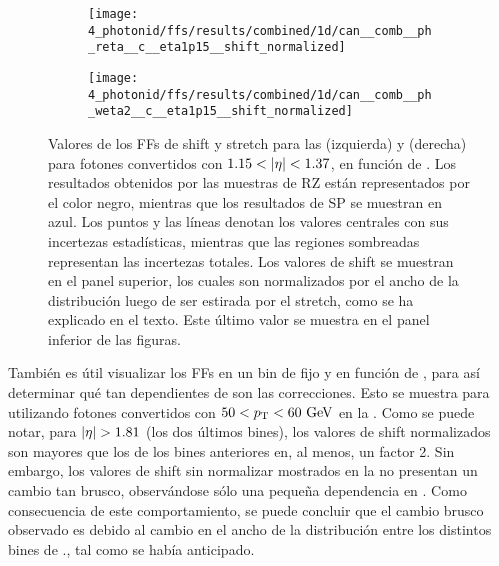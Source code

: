 \begin{figure}[ht!]
    \centering
    \begin{subfigure}[h]{0.49\linewidth}
        \centering
        \texttt{[image: 4\_photonid/ffs/results/combined/1d/can\_\_comb\_\_ph\_reta\_\_c\_\_eta1p15\_\_shift\_normalized]}
        \caption{\reta}
        \label{fig:ss_corrections:ffs:reslts:ffs:reta}
    \end{subfigure}
    \hfill
    \begin{subfigure}[h]{0.49\linewidth}
        \centering
        \texttt{[image: 4\_photonid/ffs/results/combined/1d/can\_\_comb\_\_ph\_weta2\_\_c\_\_eta1p15\_\_shift\_normalized]}
        \caption{\weta}
        \label{fig:ss_corrections:ffs:reslts:ffs:weta}
    \end{subfigure}
    \caption{Valores de los \acp{FF} de shift y stretch para las \reta (izquierda) y \weta (derecha) para fotones convertidos con \(1.15<\abseta<1.37\), en funci\'on de \pt. Los resultados obtenidos por las muestras de \ac{RZ} est\'an representados por el color negro, mientras que los resultados de \ac{SP} se muestran en azul. Los puntos y las l\'ineas denotan los valores centrales con sus incertezas estad\'isticas, mientras que las regiones sombreadas representan las incertezas totales. Los valores de shift se muestran en el panel superior, los cuales son normalizados por el ancho de la distribuci\'on luego de ser estirada por el stretch, como se ha explicado en el texto. Este \'ultimo valor se muestra en el panel inferior de las figuras.}
    \label{fig:ss_corrections:ffs:reslts:ffs}
\end{figure}

También es útil visualizar los \acp{FF} en un bin de \pt fijo y en función de \abseta, para as\'i determinar qu\'e tan dependientes de \abseta son las correcciones. Esto se muestra para \wstot utilizando fotones convertidos con \(50<p_{\text{T}}<60~\text{GeV}\) en la \Fig{\ref{fig:ss_corrections:ffs:reslts:ffs_eta_wstot}}. Como se puede notar, para \(\abseta>1.81\) (los dos últimos bines), los valores de shift normalizados son mayores que los de los bines anteriores en, al menos, un factor 2. Sin embargo, los valores de shift sin normalizar mostrados en la \Fig{\ref{fig:ss_corrections:ffs:reslts:ffs_eta_wstot:raw_shift}} no presentan un cambio tan brusco, observ\'andose s\'olo una peque\~na dependencia en \abseta. Como consecuencia de este comportamiento, se puede concluir que el cambio brusco observado es debido al cambio en el ancho de la distribuci\'on entre los distintos bines de \abseta., tal como se hab\'ia anticipado.


